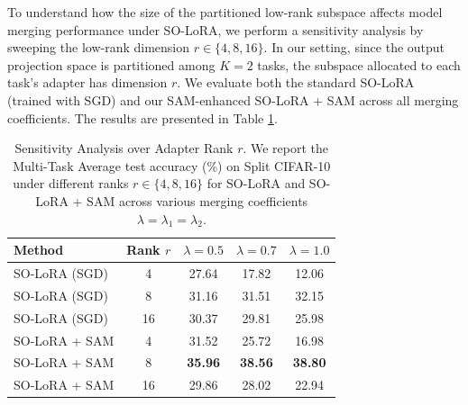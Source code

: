 \documentclass{article}
\theoremstyle{plain}
\theoremstyle{definition}
\theoremstyle{remark}
\begin{document}
To understand how the size of the partitioned low-rank subspace affects model merging performance under SO-LoRA, we perform a sensitivity analysis by sweeping the low-rank dimension $r \in \{4, 8, 16\}$. In our setting, since the output projection space is partitioned among $K=2$ tasks, the subspace allocated to each task's adapter has dimension $r$. We evaluate both the standard SO-LoRA (trained with SGD) and our SAM-enhanced SO-LoRA + SAM across all merging coefficients. The results are presented in Table \ref{tab:rank_sweep}.

\begin{table}[htbp]
\caption{Sensitivity Analysis over Adapter Rank $r$. We report the Multi-Task Average test accuracy (\%) on Split CIFAR-10 under different ranks $r \in \{4, 8, 16\}$ for SO-LoRA and SO-LoRA + SAM across various merging coefficients $\lambda = \lambda_1 = \lambda_2$.}
\label{tab:rank_sweep}
\vskip 0.1in
\begin{center}
\begin{small}
\begin{sc}
\setlength{\tabcolsep}{3.5pt}
\begin{tabular}{lcccc}
\toprule
Method & Rank $r$ & $\lambda=0.5$ & $\lambda=0.7$ & $\lambda=1.0$ \\
\midrule
SO-LoRA (SGD) & 4 & 27.64 & 17.82 & 12.06 \\
SO-LoRA (SGD) & 8 & 31.16 & 31.51 & 32.15 \\
SO-LoRA (SGD) & 16 & 30.37 & 29.81 & 25.98 \\
\midrule
SO-LoRA + SAM & 4 & 31.52 & 25.72 & 16.98 \\
SO-LoRA + SAM & 8 & \textbf{35.96} & \textbf{38.56} & \textbf{38.80} \\
SO-LoRA + SAM & 16 & 29.86 & 28.02 & 22.94 \\
\bottomrule
\end{tabular}
\end{sc}
\end{small}
\end{center}
\vskip -0.1in
\end{table}
\end{document}
